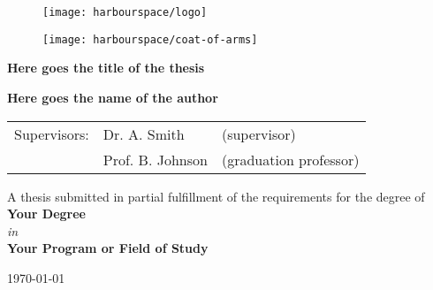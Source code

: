 \begin{figure}[h]
    \texttt{[image: harbourspace/logo]}
    \centering
\end{figure}

\vspace{1cm}

\begin{figure}[h]
    \texttt{[image: harbourspace/coat-of-arms]}
    \centering
\end{figure}

\vspace{1cm}

\begin{center}
    \LARGE\textbf{Here goes the title of the thesis}
\end{center}

\vspace{0.5cm}

\begin{center}
    \Large\textbf{Here goes the name of the author}
\end{center}

\begin{center}
    \begin{tabular}{lll}
        Supervisors: & Dr. A. Smith     & (supervisor)           \\
                     & Prof. B. Johnson & (graduation professor)
    \end{tabular}
\end{center}

\vspace{0.5cm}

\vfill

\begin{center}
    A thesis submitted in partial fulfillment
    of the requirements for the degree of\\[0.1cm]
    \textbf{Your Degree}\\[0.5cm]
    \textit{in}\\[0.1cm]
    \textbf{Your Program or Field of Study}\\[1cm]
\end{center}

\vspace{0.5cm}

\begin{center}
    \today
\end{center}